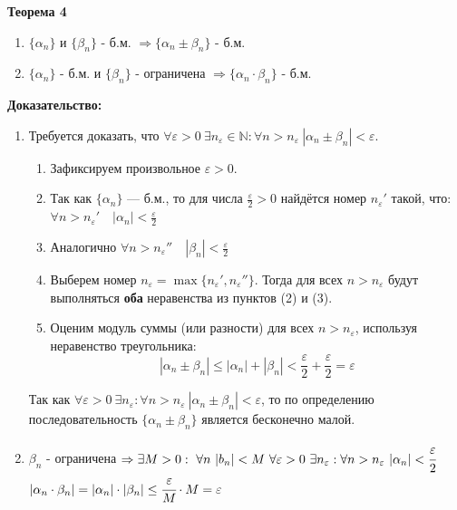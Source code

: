 \documentclass[12pt, a4paper]{article}
\newcommand{\eps}{\varepsilon}
\begin{document}
\begin{tcolorbox}
\textbf{Теорема 4}
\begin{enumerate}
    \item $\{\alpha_n\}$ и $\{\beta_n\}$ - б.м. $\Rightarrow \{\alpha_n \pm \beta_n\}$ - б.м.
    \item $\{\alpha_n\}$ - б.м. и $\{\beta_n\}$ - ограничена $\Rightarrow \{\alpha_n \cdot \beta_n\}$ - б.м.
\end{enumerate}
\end{tcolorbox}

\begin{tcolorbox}[title=Доказательство Т4: Предел суммы/разности б.м. последовательностей, breakable]
\small

\textbf{Доказательство:}
\begin{enumerate}

\item[I] Требуется доказать, что \( \forall \varepsilon > 0\ \exists n_\varepsilon \in \mathbb{N} : \forall n > n_\varepsilon\ |\alpha_n \pm \beta_n| < \varepsilon \).

\begin{enumerate}
    \item[1.] Зафиксируем произвольное \( \varepsilon > 0 \).
    \item[2.] Так как \( \{\alpha_n\} \) — б.м., то для числа \( \frac{\varepsilon}{2} > 0 \) найдётся номер \( n_{\varepsilon}' \) такой, что: $\forall n > n_{\varepsilon}'\quad |\alpha_n| < \frac{\varepsilon}{2}$
    
    \item[3.] Аналогично $\forall n > n_{\varepsilon}''\quad |\beta_n| < \frac{\varepsilon}{2}$
    
    \item[4.] Выберем номер \( n_\varepsilon = \max\{n_{\varepsilon}', n_{\varepsilon}''\} \). Тогда для всех \( n > n_\varepsilon \) будут выполняться \textbf{оба} неравенства из пунктов (2) и (3).
    \item[5.] Оценим модуль суммы (или разности) для всех \( n > n_\varepsilon \), используя неравенство треугольника:
    \[
    |\alpha_n \pm \beta_n| \leq |\alpha_n| + |\beta_n| < \frac{\varepsilon}{2} + \frac{\varepsilon}{2} = \varepsilon
    \]
\end{enumerate}

Так как \( \forall \varepsilon > 0\ \exists n_\varepsilon: \forall n > n_\eps\ |\alpha_n \pm \beta_n| < \varepsilon \), то по определению последовательность \( \{\alpha_n \pm \beta_n\} \) является бесконечно малой.

\item[II] {$\beta_n$} - ограничена $\Rightarrow \exists M > 0:\ \forall n \ |b_n| < M \ \forall\eps > 0\ \exists n_\eps : \forall n > n_\eps\ |\alpha_n| < \cfrac{\eps}{2}$\\
$|\alpha_n \cdot \beta_n|= |\alpha_n| \cdot |\beta_n| \leq \cfrac{\eps}{M} \cdot M = \eps$
\end{enumerate}
\end{tcolorbox}
\end{document}
